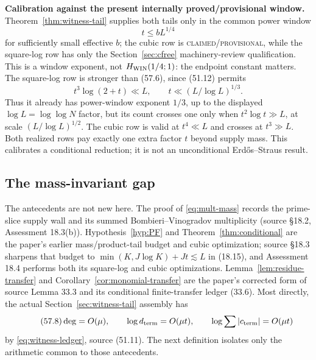 \documentclass[10pt,reqno]{amsart}
\theoremstyle{definition}
\newcommand{\1}{\mathbf 1}
\begin{document}
\medskip\noindent\textbf{Calibration against the present
internally proved/provisional window.}
Theorem~\ref{thm:witness-tail} supplies both tails only in the common power
window
\begin{equation}\tag{57.6}
                         t\leq bL^{1/4}
\end{equation}
for sufficiently small effective $b$; the cubic row is
\textsc{claimed/provisional}, while the square-log row has only the
Section~\ref{sec:cfree} machinery-review qualification.  This is a window
exponent, not $H_{\rm WIN}(1/4;1)$: the endpoint constant matters.  The
square-log row is stronger than (57.6), since (51.12) permits
\begin{equation}\tag{57.7}
 t^3\log(2+t)\ll L,
       \qquad t\ll(L/\log L)^{1/3}.
\end{equation}
Thus it already has power-window exponent $1/3$, up to the displayed
$\log L=\log\log N$ factor, but its count crosses one only when
$t^2\log t\gg L$, at scale $(L/\log L)^{1/2}$.  The cubic row is valid at
$t^4\ll L$ and crosses at $t^3\gg L$.  Both realized rows pay exactly one
extra factor $t$ beyond supply mass.  This calibrates a conditional
reduction; it is not an unconditional Erd\H{o}s--Straus result.

\subsection{The mass-invariant gap}
The antecedents are not new here.  The proof of \eqref{eq:mult-mass} records
the prime-slice supply wall and its summed Bombieri--Vinogradov multiplicity
(source \S18.2, Assessment 18.3(b)).  Hypothesis~\ref{hyp:PF} and
Theorem~\ref{thm:conditional} are the paper's earlier mass/product-tail
budget and cubic optimization; source \S18.3 sharpens that budget to
$\min(K,J\log K)+Jt\lesssim L$ in (18.15), and Assessment 18.4 performs
both its square-log and cubic optimizations.  Lemma~\ref{lem:residue-transfer}
and Corollary~\ref{cor:monomial-transfer} are the paper's corrected form of
source Lemma 33.3 and its conditional finite-transfer ledger (33.6).  Most
directly, the actual Section~\ref{sec:witness-tail} assembly has
\begin{equation}\tag{57.8}
 \deg=O(\mu),\qquad \log d_{\rm term}=O(\mu t),\qquad
 \log\sum|c_{\rm term}|=O(\mu t)
\end{equation}
by \eqref{eq:witness-ledger}, source (51.11).  The next definition isolates
only the arithmetic common to those antecedents.
\end{document}
